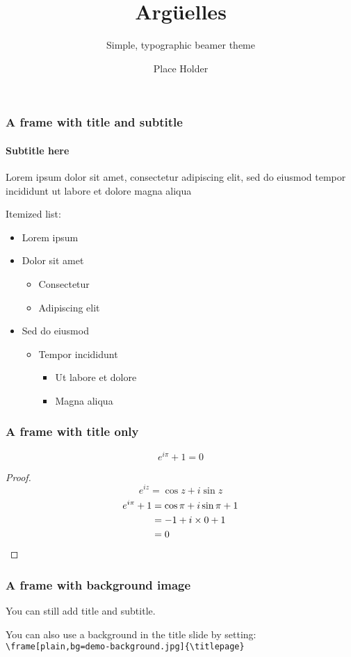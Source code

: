 \documentclass[compress,12pt]{beamer}
\title{Argüelles}
\subtitle{Simple, typographic beamer theme}
\date{}
\author{Place Holder}
\institute{University of \TeX}
\begin{document}
\frame[plain]{\titlepage}


\begin{frame}
  \frametitle{A frame with title and subtitle}
  \framesubtitle{Subtitle here}
  Lorem ipsum dolor sit amet, consectetur adipiscing elit, sed do eiusmod tempor incididunt ut labore et dolore magna aliqua \par
  Itemized list:
  \begin{itemize}
    \item Lorem ipsum
    \item Dolor sit amet
          \begin{itemize}
            \item Consectetur
            \item Adipiscing elit
          \end{itemize}
    \item Sed do eiusmod
          \begin{itemize}
            \item Tempor incididunt
                  \begin{itemize}
                    \item Ut labore et dolore
                    \item Magna aliqua
                  \end{itemize}
          \end{itemize}
  \end{itemize}
\end{frame}

\begin{frame}
  \frametitle{A frame with title only}
  \begin{theorem}
    \[e^{i\pi}+1=0\]
    \begin{proof}
      \begin{equation*}
        e^{iz}=\cos{z}+i\sin{z}
      \end{equation*}
      \begin{align*}
        e^{i\pi}+1 & \null=\cos\pi+i\sin\pi+1 \\
                   & \null=-1+i\times0+1      \\
                   & \null=0
      \end{align*}
    \end{proof}
  \end{theorem}
\end{frame}

\begin{frame}[bg=demo-arguelles.png]
  \frametitle{A frame with background image}
  You can still add title and subtitle. \par
  You can also use a background in the title slide by setting: \\
  \texttt{\textbackslash frame[plain,bg=demo-background.jpg]\{\textbackslash titlepage\}}
\end{frame}
\end{document}
